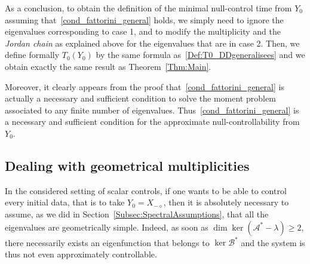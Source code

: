 \documentclass[AHL,Unicode,longabstracts]{cedram}
\newcommand\As{\mathcal{A}^*}
\newcommand\Bs{\mathcal{B}^*}
\newcommand{\Xmalpha}{X_{-\diamond}}
\newcommand{\Fzp}{Y_0}
\begin{document}
As a conclusion, to obtain the definition of the minimal null-control time from $\Fzp$ assuming that~\eqref{cond_fattorini_general} holds, we simply need to ignore the eigenvalues corresponding to case 1, and to modify the multiplicity and the {\em Jordan chain} as explained above for the eigenvalues that are in case 2. Then, we define formally $T_0(\Fzp)$ by the same formula as~\eqref{Def:T0_DDgeneralisees} and we obtain exactly the same result as Theorem~\ref{Thm:Main}.

Moreover, it clearly appears from the proof that~\eqref{cond_fattorini_general} is actually a necessary and sufficient condition to solve the moment problem associated to any finite number of eigenvalues. Thus~\eqref{cond_fattorini_general} is a necessary and sufficient condition for the approximate null-controllability from $\Fzp$.



\subsection{Dealing with geometrical multiplicities} \label{Subsec:MultipliciteGeo}

In the considered setting of scalar controls, if one wants to be able to control every initial data, that is to take $\Fzp=\Xmalpha$, then it is absolutely necessary to assume, as we did in Section~\ref{Subsec:SpectralAssumptions}, that all the eigenvalues are geometrically simple. Indeed, as soon as $\dim \ker(\As-\lambda)\geq 2$, there necessarily exists an eigenfunction that belongs to $\ker \Bs$ and the system is thus not even approximately controllable.
\end{document}
